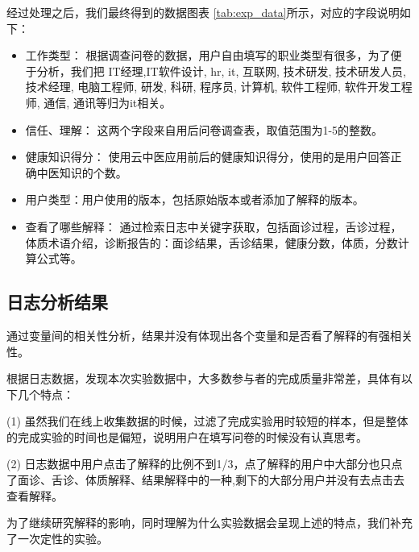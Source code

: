 经过处理之后，我们最终得到的数据图表 \ref{tab:exp_data}所示，对应的字段说明如下：

\begin{itemize}
  \item 工作类型： 根据调查问卷的数据，用户自由填写的职业类型有很多，为了便于分析，我们把 IT经理,IT软件设计, hr, it, 互联网, 技术研发, 技术研发人员, 技术经理, 电脑工程师, 研发, 科研, 程序员, 计算机, 软件工程师, 软件开发工程师, 通信, 通讯等归为it相关。

  \item  信任、理解： 这两个字段来自用后问卷调查表，取值范围为1-5的整数。

  \item  健康知识得分： 使用云中医应用前后的健康知识得分，使用的是用户回答正确中医知识的个数。

  \item  用户类型：用户使用的版本，包括原始版本或者添加了解释的版本。

  \item  查看了哪些解释： 通过检索日志中关键字获取，包括面诊过程，舌诊过程，体质术语介绍，诊断报告的：面诊结果，舌诊结果，健康分数，体质，分数计算公式等。
\end{itemize}


\subsection{日志分析结果}

通过变量间的相关性分析，结果并没有体现出各个变量和是否看了解释的有强相关性。

根据日志数据，发现本次实验数据中，大多数参与者的完成质量非常差，具体有以下几个特点：

(1) 虽然我们在线上收集数据的时候，过滤了完成实验用时较短的样本，但是整体的完成实验的时间也是偏短，说明用户在填写问卷的时候没有认真思考。

(2) 日志数据中用户点击了解释的比例不到1/3，点了解释的用户中大部分也只点了面诊、舌诊、体质解释、结果解释中的一种,剩下的大部分用户并没有去点击去查看解释。

为了继续研究解释的影响，同时理解为什么实验数据会呈现上述的特点，我们补充了一次定性的实验。





